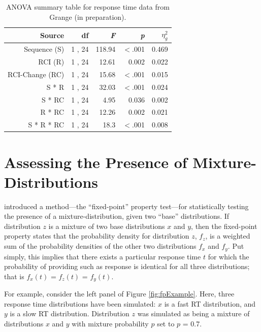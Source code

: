 \documentclass[a4paper, jou, natbib]{apa6}
\begin{document}
\begin{table}[htbp]
  \centering
  \caption{ANOVA summary table for response time data from Grange (in preparation).}
    \begin{tabular}{rrrrr}
    \toprule
    Source & df    & \emph{F}     & \emph{p}     & $\eta_{g}^{2}$ \\
    \midrule
    Sequence (S) & 1 , 24 & 118.94 & $<$.001 & 0.469 \\
    RCI (R) & 1 , 24 & 12.61 & 0.002 & 0.022 \\
    RCI-Change (RC) & 1 , 24 & 15.68 & $<$.001 & 0.015 \\
    S * R & 1 , 24 & 32.03 & $<$.001 & 0.024 \\
    S * RC & 1 , 24 & 4.95  & 0.036 & 0.002 \\
    R * RC & 1 , 24 & 12.26 & 0.002 & 0.021 \\
    S * R * RC & 1 , 24 & 18.3  & $<$.001 & 0.008 \\
    \bottomrule
    \end{tabular}%
  \label{tab:grangeData}%
\end{table}%


\section{Assessing the Presence of Mixture-Distributions}
\cite{VanMaanen2014} introduced a method---the ``fixed-point'' property test---for statistically testing the presence of a mixture-distribution, given two ``base'' distributions. If distribution $z$ is a mixture of two base distributions $x$ and $y$, then the fixed-point property states that the probability density for distribution $z$, $f_{z}$, is a weighted sum of the probability densities of the other two distributions $f_{x}$ and $f_{y}$. Put simply, this implies that there exists a particular response time $t$ for which the probability of providing such as response is identical for all three distributions; that is $f_{x}(t)$ = $f_{z}(t)$ = $f_{y}(t)$. 

For example, consider the left panel of Figure \ref{fig:fpExample}. Here, three response time distributions have been simulated: $x$ is a fast RT distribution, and $y$ is a slow RT distribution. Distribution $z$ was simulated as being a mixture of distributions $x$ and $y$ with mixture probability $p$ set to $p$ = 0.7.  
\end{document}
